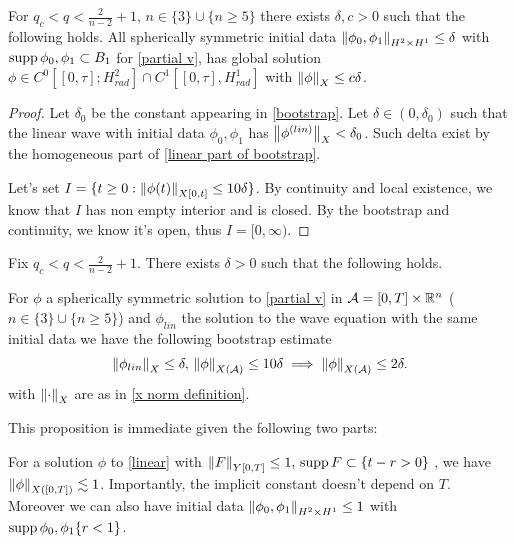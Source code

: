 \documentclass[11pt, oneside]{amsart}
\begin{document}
	\begin{theorem}\label{partival v main theorem}
		For $q_c<q<\frac{2}{n-2}+1$, $n\in\{3\}\cup\{n\geq5\}$ there exists $\delta,c>0$ such that the following holds. All spherically symmetric initial data $\left\lVert \phi_0,\phi_1\right\rVert_{H^2\times H^1}\leq\delta$ with $\operatorname{supp}\phi_0,\phi_1\subset B_1$ for \eqref{partial v}, has global solution $\phi\in C^0[[0,\tau];H_{rad}^2]\cap C^1[[0,\tau],H_{rad}^1] $ with $\left\lVert \phi\right\rVert_X\leq c\delta$.
	\end{theorem}
	\begin{proof}
		Let $\delta_0$ be the constant appearing in \cref{bootstrap}. Let $\delta\in(0,\delta_0)$ such that the linear wave with initial data $\phi_0,\phi_1$ has $\left\lVert \phi^{(lin)}\right\rVert_X<\delta_0$. Such delta exist by the homogeneous part of \cref{linear part of bootstrap}.
		
		Let's set $I=\{ t\geq0 :\left\lVert \phi(t)\right\rVert_{X[0,t]}\leq10\delta \}$. By continuity and local existence, we know that $I$ has non empty interior and is closed.  By the bootstrap and continuity, we know it's open, thus $I=[0,\infty)$.
	\end{proof}
	
	\begin{prop}\label{bootstrap}
		Fix $q_c<q<\frac{2}{n-2}+1$. There exists $\delta>0$ such that the following holds.
		
		For $\phi$ a spherically symmetric solution to \eqref{partial v} in $\mathcal{A}=[0,T]\times\mathbb{R}^n$ ($n\in\{3\}\cup\{n\geq5\}$) and $\phi_{lin}$ the solution to the wave equation with the same initial data we have the following bootstrap estimate
		\begin{equation*}
			\begin{gathered}
				\left\lVert \phi_{lin}\right\rVert_{X}\leq \delta,\, \left\lVert \phi\right\rVert_{{X}(\mathcal{A})}\leq 10\delta\implies\left\lVert \phi\right\rVert_{{X}(\mathcal{A})}\leq 2\delta.
			\end{gathered}
		\end{equation*}
		with $\left\lVert \cdot\right\rVert_{X}$ are as in \cref{x norm definition}.
	\end{prop}
	
	This proposition is immediate given the following two parts:
	\begin{lemma}\label{linear part of bootstrap}
		For a solution $\phi$ to \cref{linear} with $\left\lVert F\right\rVert_{Y[0,T]}\leq1,\,\operatorname{supp} F\subset\{t-r>0\}$ , we have $\left\lVert \phi\right\rVert_{X([0,T])}\lesssim1$. Importantly, the implicit constant doesn't depend on $T$. Moreover we can also have initial data $\left\lVert \phi_0,\phi_1\right\rVert_{H^2\times H^1}\leq1$ with $\operatorname{supp}\phi_0,\phi_1\{r<1\}$.
	\end{lemma}
	
\end{document}
